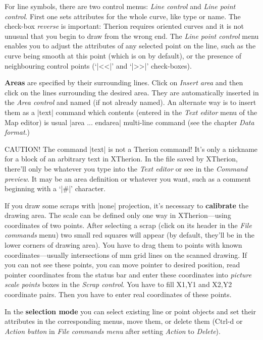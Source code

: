 For line symbols, there are two control menus: {\it Line control} and {\it Line 
point control}. First one sets attributes for the whole curve, like type or
name. The check-box {\it reverse} is important: Therion requires oriented 
curves and it is not unusual that you begin to draw from the wrong end.
The {\it Line point control} menu enables you to adjust the attributes of any selected 
point on the line, such as the curve being smooth at this point (which is on 
by default), or the presence of neighbouring control points (`|<<|' and `|>>|' 
check-boxes).

{\bf Areas} are specified by their surrounding lines. Click on {\it Insert area}
and then click on the lines surrounding the desired area. They are 
automatically inserted in the {\it Area control} and named (if not already 
named). An alternate way is to insert them as a |text| 
command which contents (entered in the {\it Text editor} menu of the Map editor) 
is usual |area ... endarea| multi-line command (see the chapter {\it Data 
format}.) 

CAUTION! The command |text| is not a Therion command! It's only a nickname for a 
block of an arbitrary text in 
XTherion. In the file saved by XTherion, there'll only be 
whatever you type into the {\it Text editor} or see in the {\it Command preview}.
It may be an area definition or whatever you want, such as a comment beginning 
with a `|#|' character.

If you draw some scraps with |none| projection, it's necessary to 
{\bf calibrate} the 
drawing area. The scale can be defined only one way in XTherion---using 
coordinates of two points. After selecting a scrap (click on its header in the 
{\it File commands} menu) two small red squares 
will appear (by default, they'll be in the lower corners of drawing area). 
You have to drag them to points with known coordinates---usually intersections 
of mm grid lines on the scanned drawing. If you can not see these points, 
you can move pointer to desired position, read pointer coordinates from 
the status bar and enter these coordinates into {\it picture scale points}
boxes in the {\it Scrap control}. You have to fill X1,Y1 and
X2,Y2 coordinate pairs. Then you have to enter real coordinates of these
points. 

In the {\bf selection mode} you can select existing line or point objects and  
set their attributes in the corresponding menus, move them, or delete them (Ctrl-d or 
{\it Action button} in {\it File commands menu} after setting {\it Action} to 
{\it Delete}).

